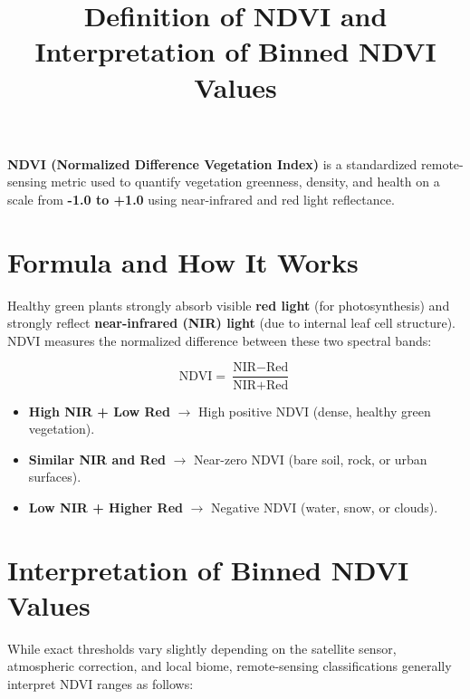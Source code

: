 \documentclass[11pt,a4paper]{article}
\title{Definition of NDVI and Interpretation of Binned NDVI Values}
\author{}
\date{}
\begin{document}
\maketitle

\noindent \textbf{NDVI (Normalized Difference Vegetation Index)} is a standardized remote-sensing metric used to quantify vegetation greenness, density, and health on a scale from \textbf{-1.0 to +1.0} using near-infrared and red light reflectance.

\section*{Formula and How It Works}
Healthy green plants strongly absorb visible \textbf{red light} (for photosynthesis) and strongly reflect \textbf{near-infrared (NIR) light} (due to internal leaf cell structure). NDVI measures the normalized difference between these two spectral bands:

\[
\text{NDVI} = \frac{\text{NIR} - \text{Red}}{\text{NIR} + \text{Red}}
\]

\begin{itemize}
    \item \textbf{High NIR + Low Red} $\rightarrow$ High positive NDVI (dense, healthy green vegetation).
    \item \textbf{Similar NIR and Red} $\rightarrow$ Near-zero NDVI (bare soil, rock, or urban surfaces).
    \item \textbf{Low NIR + Higher Red} $\rightarrow$ Negative NDVI (water, snow, or clouds).
\end{itemize}

\section*{Interpretation of Binned NDVI Values}
While exact thresholds vary slightly depending on the satellite sensor, atmospheric correction, and local biome, remote-sensing classifications generally interpret NDVI ranges as follows:
\end{document}
